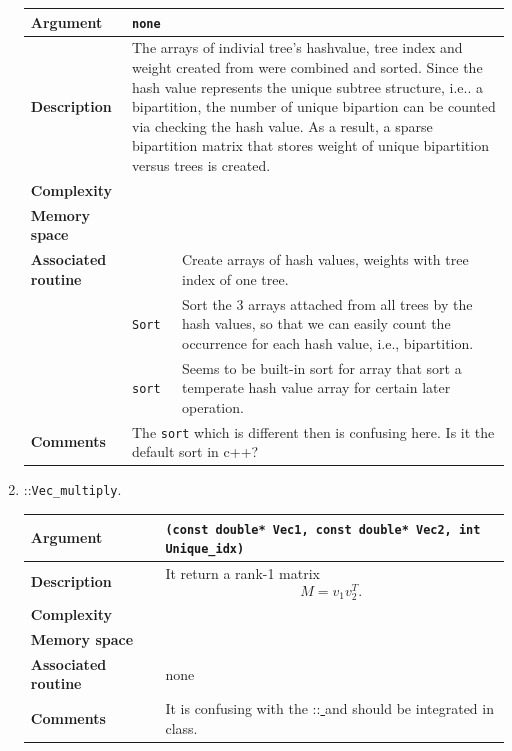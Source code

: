 \documentclass[11pt,a4paper]{article}
\newcommand{\myuline}[1]{%
	\uline{\phantom{#1}}%
	\llap{\contour{white}{#1}}%
}
\newcommand{\mrref}[1]{\texttt{#1}\label{#1}}
\newcommand{\mtref}[2]{\texttt{#1}\label{#2}}
\newcommand{\rref}[1]{\hyperref[#1]{\textcolor{blue}{\myuline{\texttt{#1}}}}}
\newcommand{\tref}[2]{\hyperref[#2]{\textcolor{blue}{\myuline{\texttt{#1}}}}}
\theoremstyle{definition}
\theoremstyle{definition}
\numberwithin{equation}{section}
\begin{document}
\begin{enumerate}
		\begin{tabular}{>{\bfseries}lp{}p{}}
			\hline
			Argument & \multicolumn{2}{p{0.6\textwidth}}{\texttt{none}} \\
			\hline
			Description & \multicolumn{2}{p{0.6\textwidth}}{The arrays of indivial tree's hashvalue, tree index and weight created from \rref{bipart} were combined and sorted. Since the hash value represents the unique subtree structure, i.e.. a bipartition, the number of unique bipartion can be counted via checking the hash value. As a result, a sparse bipartition matrix that stores weight of unique bipartition versus trees is created.} \\
			\hline
			Complexity&   &  \\
			Memory space&   &  \\
			\hline
			Associated routine& \rref{bipart} & Create arrays of hash values, weights with tree index of one tree.\\
			& \mrref{Sort} & Sort the 3 arrays attached from all trees by the hash values, so that we can easily count the occurrence for each hash value, i.e., bipartition.\\
			& \mrref{sort} & Seems to be built-in sort for array that sort a temperate hash value array for certain later operation.\\
			\hline
			Comments & \multicolumn{2}{p{0.6\textwidth}}{The \texttt{sort} which is different then \rref{Sort} is confusing here. Is it the default sort in c++?} \\
			\hline
		\end{tabular}
	
		
	
		\item \rref{Trees}::\mtref{Vec\_multiply}{Vecmultiply}.
		
		\begin{tabular}{>{\bfseries}lp{}p{}}
			\hline
			Argument & \multicolumn{2}{p{0.6\textwidth}}{\texttt{(const double* Vec1, const double* Vec2, int Unique\_idx)}} \\
			\hline
			Description & \multicolumn{2}{p{0.6\textwidth}}{It return a rank-1 matrix $$M = v_1v_2^T.$$} \\
			\hline
			Complexity&   &  \\
			Memory space&   &  \\
			\hline
			Associated routine& none & \\
			\hline
			Comments & \multicolumn{2}{p{0.6\textwidth}}{It is confusing with the \rref{SparseMatrix}::\tref{Multiply\_vec}{Multiplyvec} and should be integrated in \rref{Vector} class.} \\
			\hline
		\end{tabular}
	

\end{enumerate}
\end{document}

